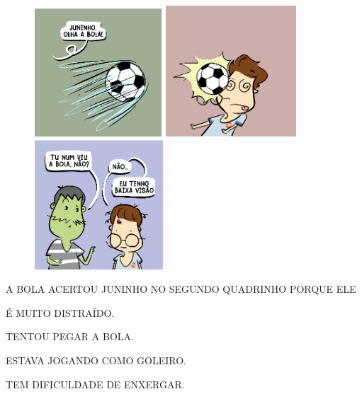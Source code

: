 \begin{figure}[htpb]
\includegraphics[width=1.88542in,height=1.88542in]{media/image236.png}
\includegraphics[width=1.92708in,height=1.92708in]{media/image237.png}
\includegraphics[width=1.90625in,height=1.90625in]{media/image238.png}
\end{figure}


A BOLA ACERTOU JUNINHO NO SEGUNDO QUADRINHO PORQUE ELE

\begin{escolha}
\item É MUITO DISTRAÍDO.

\item TENTOU PEGAR A BOLA. 

\item ESTAVA JOGANDO COMO GOLEIRO.

\item TEM DIFICULDADE DE ENXERGAR.
\end{escolha}

